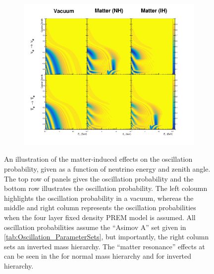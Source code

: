\begin{figure}[h]
  \begin{subfigure}[t]{\textwidth}
    \includegraphics[width=\textwidth, trim={0mm 0mm 0mm 0mm}, clip,page=1]{Figures/Oscillation/MatterEffect.pdf}
  \end{subfigure}
  \caption{An illustration of the matter-induced effects on the oscillation probability, given as a function of neutrino energy and zenith angle. The top row of panels gives the  oscillation probability and the bottom row illustrates the  oscillation probability. The left coloumn highlights the oscillation probability in a vacuum, whereas the middle and right column represents the oscillation probabilities when the four layer fixed density PREM model is assumed. All oscillation probabilities assume the ``Asimov A'' set given in \autoref{tab:Oscillation_ParameterSets}, but importantly, the right column sets an inverted mass hierarchy. The ``matter resonance'' effects at  can be seen in the  for normal mass hierarchy and  for inverted hierarchy.}
  \label{fig:Oscillation_SK_VacuumMatter}
\end{figure}

